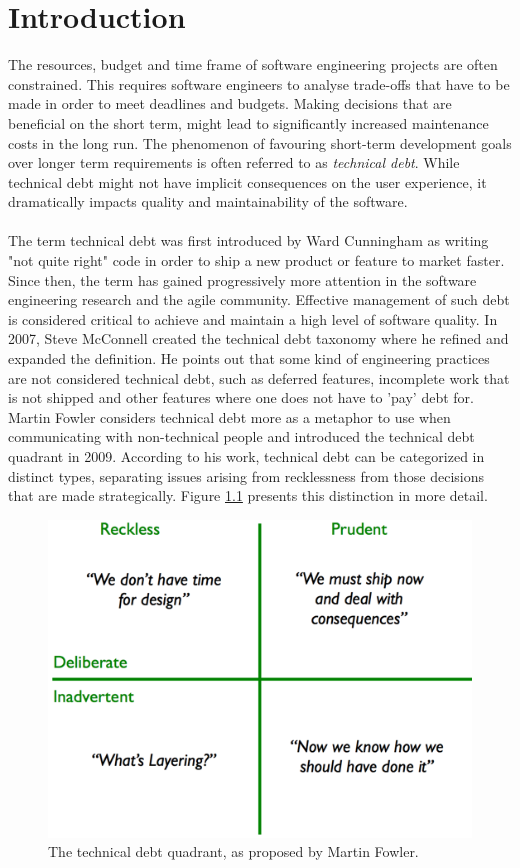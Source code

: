 \chapter{Introduction}


The resources, budget and time frame of software engineering projects are often constrained.
This requires software engineers to analyse trade-offs that have to be made in order to meet deadlines and budgets.
Making decisions that are beneficial on the short term, might lead to significantly increased maintenance costs in the long run.
The phenomenon of favouring short-term development goals over longer term requirements is often referred to as \emph{technical debt}.
While technical debt might not have implicit consequences on the user experience, it dramatically impacts quality and maintainability of the software.\\\\
The term technical debt was first introduced by Ward Cunningham as writing "not quite right" code in order to ship a new product or feature to market faster\cite{cunningham1993wycash}.
Since then, the term has gained progressively more attention in the software engineering research and the agile community.
Effective management of such debt is considered critical to achieve and maintain a high level of software quality.
In 2007, Steve McConnell created the technical debt taxonomy where he refined and expanded the definition\cite{mcconnell2007debt}.
He points out that some kind of engineering practices are not considered technical debt, such as deferred features, incomplete work that is not shipped and other features where one does not have to 'pay' debt for.
Martin Fowler considers technical debt more as a metaphor to use when communicating with non-technical people and introduced the technical debt quadrant in 2009\cite{technicaldebtquadrant}.
According to his work, technical debt can be categorized in distinct types, separating issues arising from recklessness from those decisions that are made strategically. 
Figure \ref{fig:technical-debt-quadrant} presents this distinction in more detail.\\

\begin{figure}[!h]
	\centering
	\includegraphics[width=0.5\columnwidth]{images/technical_debt_quadrant}
	\caption{The technical debt quadrant, as proposed by Martin Fowler.}
	\label{fig:technical-debt-quadrant}
\end{figure}

